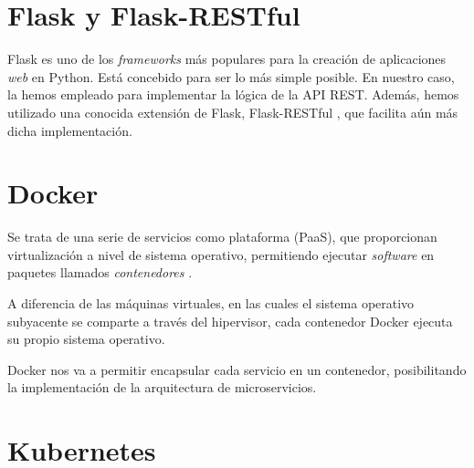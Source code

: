  \label{chapter:tecnicas}

\section{Flask y Flask-RESTful}

Flask es uno de los \emph{frameworks} más populares para la creación de aplicaciones \emph{web} en Python\cite{flask}. Está concebido para ser lo más simple posible. En nuestro caso, la hemos empleado para implementar la lógica de la API REST. Además, hemos utilizado una conocida extensión de Flask, Flask-RESTful \cite{flaskRestful}, que facilita aún más dicha implementación.


\section{Docker}

Se trata de una serie de servicios como plataforma (PaaS), que proporcionan virtualización a nivel de sistema operativo, permitiendo ejecutar \emph{software} en paquetes llamados \emph{contenedores} \cite{docker}.

A diferencia de las máquinas virtuales, en las cuales el sistema operativo subyacente se comparte a través del hipervisor, cada contenedor Docker ejecuta su propio sistema operativo.

Docker nos va a permitir encapsular cada servicio en un contenedor, posibilitando la implementación de la arquitectura de microservicios.



\section{Kubernetes}


